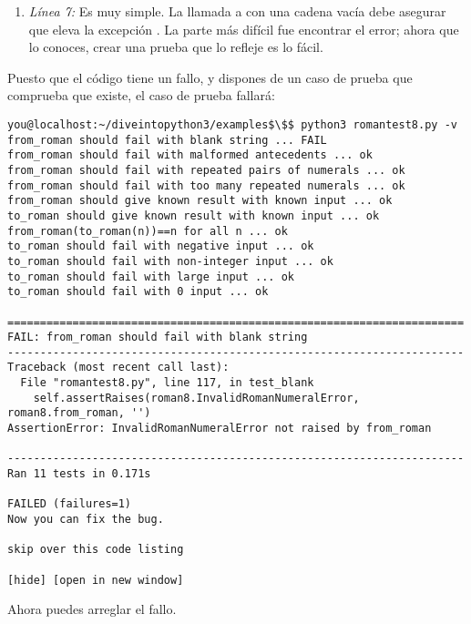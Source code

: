 \begin{enumerate}

\item \emph{Línea 7:} Es muy simple. La llamada a  con una cadena vacía debe asegurar que eleva la excepción . La parte más difícil fue encontrar el error; ahora que lo conoces, crear una prueba que lo refleje es lo fácil.

\end{enumerate}

Puesto que el código tiene un fallo, y dispones de un caso de prueba que comprueba que existe, el caso de prueba fallará:

\noindent\begin{minipage}{\textwidth}
\begin{lstlisting}[mathescape=True]
you@localhost:~/diveintopython3/examples$\$$ python3 romantest8.py -v
from_roman should fail with blank string ... FAIL
from_roman should fail with malformed antecedents ... ok
from_roman should fail with repeated pairs of numerals ... ok
from_roman should fail with too many repeated numerals ... ok
from_roman should give known result with known input ... ok
to_roman should give known result with known input ... ok
from_roman(to_roman(n))==n for all n ... ok
to_roman should fail with negative input ... ok
to_roman should fail with non-integer input ... ok
to_roman should fail with large input ... ok
to_roman should fail with 0 input ... ok

======================================================================
FAIL: from_roman should fail with blank string
----------------------------------------------------------------------
Traceback (most recent call last):
  File "romantest8.py", line 117, in test_blank
    self.assertRaises(roman8.InvalidRomanNumeralError, roman8.from_roman, '')
AssertionError: InvalidRomanNumeralError not raised by from_roman

----------------------------------------------------------------------
Ran 11 tests in 0.171s

FAILED (failures=1)
Now you can fix the bug.

skip over this code listing

[hide] [open in new window]
\end{lstlisting}
\end{minipage}

Ahora puedes arreglar el fallo.

